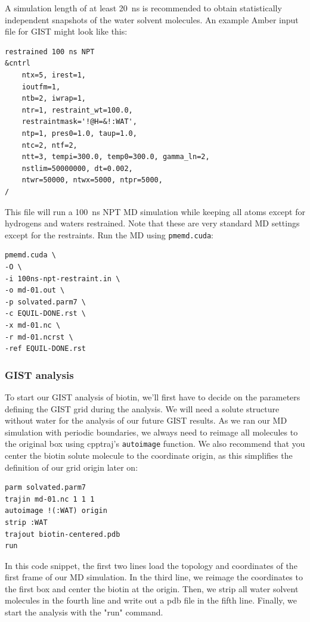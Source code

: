 \documentclass[9pt,tutorial]{livecoms}
\newcommand{\software}{\texttt}
\newcommand\inlinecode{\texttt}
\begin{document}
A simulation length of at least \SI{20}{\nano\second} is recommended to obtain statistically independent snapshots of the water solvent molecules. 
An example Amber input file for GIST might look like this:
\begin{lstlisting}[style=amber-in]
restrained 100 ns NPT
&cntrl
	ntx=5, irest=1,
	ioutfm=1,
	ntb=2, iwrap=1,
	ntr=1, restraint_wt=100.0,
	restraintmask='!@H=&!:WAT',
	ntp=1, pres0=1.0, taup=1.0,
	ntc=2, ntf=2,
	ntt=3, tempi=300.0, temp0=300.0, gamma_ln=2,
	nstlim=50000000, dt=0.002,
	ntwr=50000, ntwx=5000, ntpr=5000,
/
\end{lstlisting}
This file will run a \SI{100}{\nano\second} NPT MD simulation while keeping all atoms except for hydrogens and waters restrained.
Note that these are very standard MD settings except for the restraints.
Run the MD using \software{pmemd.cuda}:
\begin{lstlisting}[style=bash]
pmemd.cuda \
-O \
-i 100ns-npt-restraint.in \
-o md-01.out \
-p solvated.parm7 \
-c EQUIL-DONE.rst \
-x md-01.nc \
-r md-01.ncrst \
-ref EQUIL-DONE.rst
\end{lstlisting}
\subsubsection{GIST analysis}

To start our GIST analysis of biotin, we'll first have to decide on the parameters defining the GIST grid during the analysis.
We will need a solute structure without water for the analysis of our future GIST results. 
As we ran our MD simulation with periodic boundaries, we always need to reimage all molecules to the original box using cpptraj's \inlinecode{autoimage} function. 
We also recommend that you center the biotin solute molecule to the coordinate origin, as this simplifies the definition of our grid origin later on:

\begin{lstlisting}[style=cpptraj]
parm solvated.parm7 
trajin md-01.nc 1 1 1 
autoimage !(:WAT) origin 
strip :WAT 
trajout biotin-centered.pdb 
run
\end{lstlisting}
In this code snippet, the first two lines load the topology and coordinates of the first frame of our MD simulation. 
In the third line, we reimage the coordinates to the first box and center the biotin at the origin. 
Then, we strip all water solvent molecules in the fourth line and write out a pdb file in the fifth line. 
Finally, we start the analysis with the "run" command.
\end{document}
